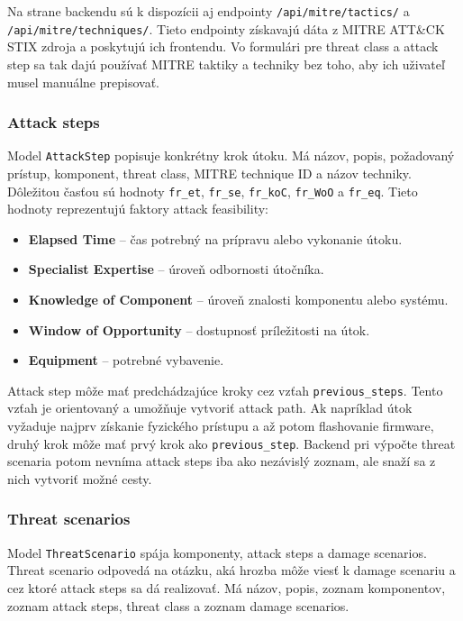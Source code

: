 \documentclass[11pt]{article}
\begin{document}
Na strane backendu sú k dispozícii aj endpointy \texttt{/api/mitre/tactics/} a \texttt{/api/mitre/techniques/}. Tieto endpointy získavajú dáta z MITRE ATT\&CK STIX zdroja a poskytujú ich frontendu. Vo formulári pre threat class a attack step sa tak dajú používať MITRE taktiky a techniky bez toho, aby ich uživateľ musel manuálne prepisovať.

\subsubsection{Attack steps}

Model \texttt{AttackStep} popisuje konkrétny krok útoku. Má názov, popis, požadovaný prístup, komponent, threat class, MITRE technique ID a názov techniky. Dôležitou časťou sú hodnoty \texttt{fr\_et}, \texttt{fr\_se}, \texttt{fr\_koC}, \texttt{fr\_WoO} a \texttt{fr\_eq}. Tieto hodnoty reprezentujú faktory attack feasibility:

\begin{itemize}
    \item \textbf{Elapsed Time} -- čas potrebný na prípravu alebo vykonanie útoku.
    \item \textbf{Specialist Expertise} -- úroveň odbornosti útočníka.
    \item \textbf{Knowledge of Component} -- úroveň znalosti komponentu alebo systému.
    \item \textbf{Window of Opportunity} -- dostupnosť príležitosti na útok.
    \item \textbf{Equipment} -- potrebné vybavenie.
\end{itemize}

Attack step môže mať predchádzajúce kroky cez vzťah \texttt{previous\_steps}. Tento vzťah je orientovaný a umožňuje vytvoriť attack path. Ak napríklad útok vyžaduje najprv získanie fyzického prístupu a až potom flashovanie firmware, druhý krok môže mať prvý krok ako \texttt{previous\_step}. Backend pri výpočte threat scenaria potom nevníma attack steps iba ako nezávislý zoznam, ale snaží sa z nich vytvoriť možné cesty.

\subsubsection{Threat scenarios}

Model \texttt{ThreatScenario} spája komponenty, attack steps a damage scenarios. Threat scenario odpovedá na otázku, aká hrozba môže viesť k damage scenariu a cez ktoré attack steps sa dá realizovať. Má názov, popis, zoznam komponentov, zoznam attack steps, threat class a zoznam damage scenarios.
\end{document}
